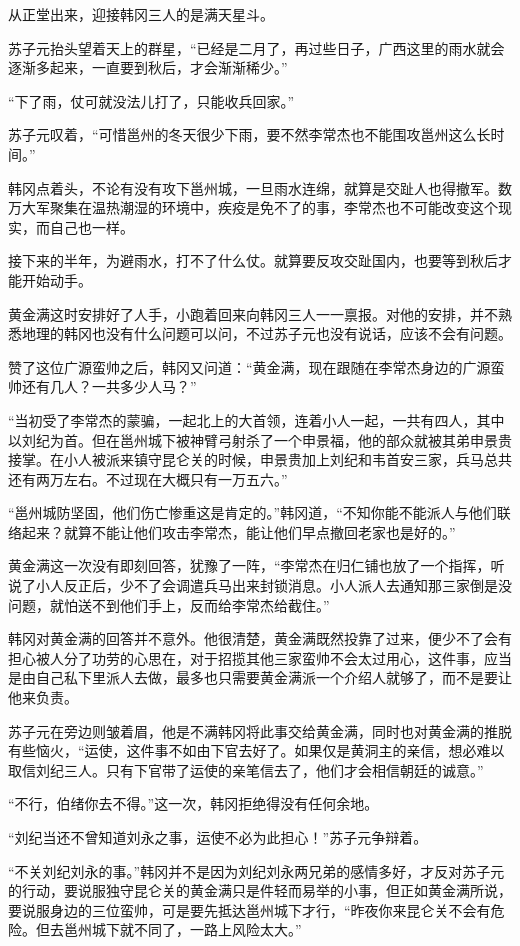 从正堂出来，迎接韩冈三人的是满天星斗。

苏子元抬头望着天上的群星，“已经是二月了，再过些日子，广西这里的雨水就会逐渐多起来，一直要到秋后，才会渐渐稀少。”

“下了雨，仗可就没法儿打了，只能收兵回家。”

苏子元叹着，“可惜邕州的冬天很少下雨，要不然李常杰也不能围攻邕州这么长时间。”

韩冈点着头，不论有没有攻下邕州城，一旦雨水连绵，就算是交趾人也得撤军。数万大军聚集在温热潮湿的环境中，疾疫是免不了的事，李常杰也不可能改变这个现实，而自己也一样。

接下来的半年，为避雨水，打不了什么仗。就算要反攻交趾国内，也要等到秋后才能开始动手。

黄金满这时安排好了人手，小跑着回来向韩冈三人一一禀报。对他的安排，并不熟悉地理的韩冈也没有什么问题可以问，不过苏子元也没有说话，应该不会有问题。

赞了这位广源蛮帅之后，韩冈又问道：“黄金满，现在跟随在李常杰身边的广源蛮帅还有几人？一共多少人马？”

“当初受了李常杰的蒙骗，一起北上的大首领，连着小人一起，一共有四人，其中以刘纪为首。但在邕州城下被神臂弓射杀了一个申景福，他的部众就被其弟申景贵接掌。在小人被派来镇守昆仑关的时候，申景贵加上刘纪和韦首安三家，兵马总共还有两万左右。不过现在大概只有一万五六。”

“邕州城防坚固，他们伤亡惨重这是肯定的。”韩冈道，“不知你能不能派人与他们联络起来？就算不能让他们攻击李常杰，能让他们早点撤回老家也是好的。”

黄金满这一次没有即刻回答，犹豫了一阵，“李常杰在归仁铺也放了一个指挥，听说了小人反正后，少不了会调遣兵马出来封锁消息。小人派人去通知那三家倒是没问题，就怕送不到他们手上，反而给李常杰给截住。”

韩冈对黄金满的回答并不意外。他很清楚，黄金满既然投靠了过来，便少不了会有担心被人分了功劳的心思在，对于招揽其他三家蛮帅不会太过用心，这件事，应当是由自己私下里派人去做，最多也只需要黄金满派一个介绍人就够了，而不是要让他来负责。

苏子元在旁边则皱着眉，他是不满韩冈将此事交给黄金满，同时也对黄金满的推脱有些恼火，“运使，这件事不如由下官去好了。如果仅是黄洞主的亲信，想必难以取信刘纪三人。只有下官带了运使的亲笔信去了，他们才会相信朝廷的诚意。”

“不行，伯绪你去不得。”这一次，韩冈拒绝得没有任何余地。

“刘纪当还不曾知道刘永之事，运使不必为此担心！”苏子元争辩着。

“不关刘纪刘永的事。”韩冈并不是因为刘纪刘永两兄弟的感情多好，才反对苏子元的行动，要说服独守昆仑关的黄金满只是件轻而易举的小事，但正如黄金满所说，要说服身边的三位蛮帅，可是要先抵达邕州城下才行，“昨夜你来昆仑关不会有危险。但去邕州城下就不同了，一路上风险太大。”

